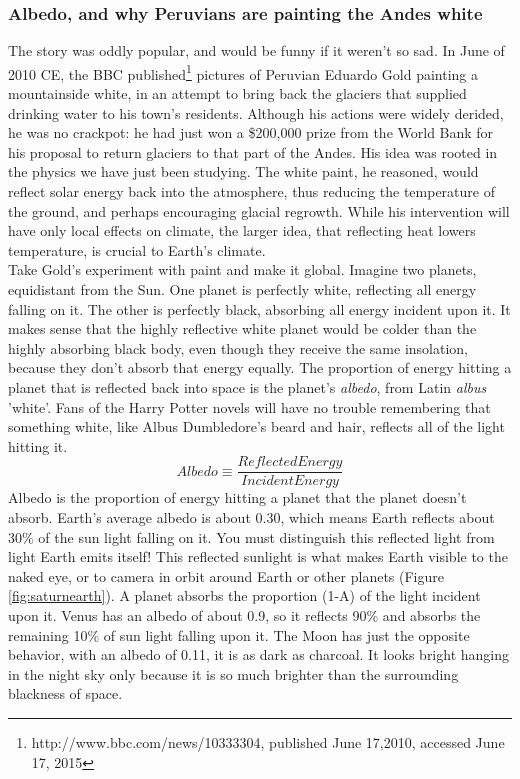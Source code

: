 \documentclass[amstex,12pt]{book}
\begin{document}
\subsubsection{Albedo, and why Peruvians are painting the Andes white}
The story was oddly popular, and would be funny if it weren't so sad. In June of 2010 CE, the BBC published\footnote{http://www.bbc.com/news/10333304, published June 17,2010, accessed June 17, 2015} pictures of Peruvian Eduardo Gold painting a mountainside white, in an attempt to bring back the glaciers that supplied drinking water to his town's residents. Although his actions were widely derided, he was no crackpot: he had just won a \$200,000 prize from the World Bank for his proposal to return glaciers to that part of the Andes. His idea was rooted in the physics we have just been studying. The white paint, he reasoned, would reflect solar energy back into the atmosphere, thus reducing the temperature of the ground, and perhaps encouraging glacial regrowth. While his intervention will have only local effects on climate, the larger idea, that reflecting heat lowers temperature, is crucial to Earth's climate.\\
Take Gold's experiment with paint and make it global. Imagine two planets, equidistant from the Sun. One planet is perfectly white, reflecting all energy falling on it. The other is perfectly black, absorbing all energy incident upon it. It makes sense that the highly reflective white planet would be colder than the highly absorbing black body, even though they receive the same insolation, because they don't absorb that energy equally. The proportion of energy hitting a planet that is reflected back into space is the planet's \emph{albedo}, from Latin \textit{albus} 'white'. Fans of the Harry Potter novels will have no trouble remembering that something white, like Albus Dumbledore's beard and hair, reflects all of the light hitting it.\\
\begin{equation}
	Albedo \equiv\frac{Reflected Energy}{Incident Energy}
\end{equation}
Albedo is the proportion of energy hitting a planet that the planet doesn't absorb. Earth's average albedo is about 0.30, which means Earth reflects about 30\% of the sun light falling on it. You must distinguish this reflected light from light Earth emits itself! This reflected sunlight is what makes Earth visible to the naked eye, or to camera in orbit around Earth or other planets (Figure \ref{fig:saturnearth}). A planet absorbs the proportion (1-A) of the light incident upon it. Venus has an albedo of about 0.9, so it reflects 90\% and absorbs the remaining 10\% of sun light falling upon it. The Moon has just the opposite behavior, with an albedo of 0.11, it is as dark as charcoal. It looks bright hanging in the night sky only because it is so much brighter than the surrounding blackness of space. 
\end{document}
